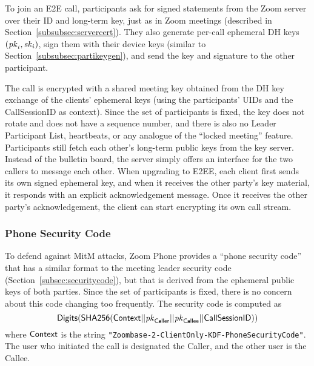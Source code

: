 To join an E2E call, participants ask for signed statements from the Zoom server over their ID and long-term key, just as in Zoom meetings (described in Section~\ref{subsubsec:servercert}). They also generate per-call ephemeral DH keys $(\mathit{pk}_i, \mathit{sk}_i)$, sign them with their device keys (similar to Section~\ref{subsubsec:partikeygen}), and send the key and signature to the other participant.

The call is encrypted with a shared meeting key obtained from the DH key exchange of the clients' ephemeral keys (using the participants' UIDs and the {\sf CallSessionID} as context). Since the set of participants is fixed, the key does not rotate and does not have a sequence number, and there is also no Leader Participant List, heartbeats, or any analogue of the ``locked meeting'' feature.
Participants still fetch each other's long-term public keys from the key server. Instead of the bulletin board, the server simply offers an interface for the two callers to message each other.
When upgrading to E2EE, each client first sends its own signed ephemeral key, and when it receives the other party's key material, it responds with an explicit acknowledgement message. Once it receives the other party's acknowledgement, the client can start encrypting its own call stream.

\subsubsection{Phone Security Code}

To defend against MitM attacks, Zoom Phone provides a ``phone security code'' that has a similar format to the meeting leader security code (Section~\ref{subsec:securitycode}), but that is derived from the ephemeral public keys of both parties. Since the set of participants is fixed, there is no concern about this code changing too frequently. The security code is computed as
$$\mathsf{Digits}({\sf SHA256}({\sf Context} || \mathit{pk}_{\sf Caller} || \mathit{pk}_{\sf Callee} || {\sf CallSessionID}))$$
where ${\sf Context}$ is the string \texttt{"Zoombase-2-ClientOnly-KDF-PhoneSecurityCode"}. The user who initiated the call is designated the {\sf Caller}, and the other user is the {\sf Callee}.

